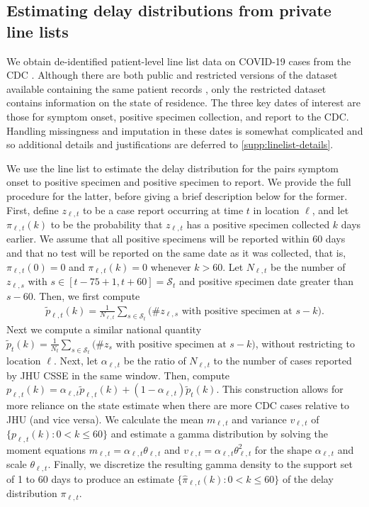 \subsection{Estimating delay distributions from private line lists}
\label{sec:delaystop}

We obtain de-identified patient-level line list data on COVID-19 cases from the
CDC \citep{cdc2020caserestr}. 
Although there are both public and restricted versions of the dataset
available containing the same patient records \citep{cdc2020casepub,
cdc2020caserestr}, only the restricted dataset contains information on the state
of residence. The three key dates of interest are those for symptom onset,
positive specimen collection, and report to the CDC. Handling missingness and
imputation in these dates is somewhat complicated and so additional details and
justifications are deferred to \autoref{supp:linelist-details}.

We use the line list to estimate the delay distribution for the pairs symptom
onset to positive specimen and positive specimen to report. We provide the full
procedure for the latter, before giving a brief description below for the
former. First, define $z_{\ell,t}$ to be a case report occurring at time $t$ in
location $\ell$, and let $\pi_{\ell,t}(k)$ to be the probability that
$z_{\ell,t}$ has a positive specimen collected $k$ days earlier. We assume that
all positive specimens will be reported within 60 days and that no test will be
reported on the same date as it was collected, that is, $\pi_{\ell,t}(0) = 0$
and $\pi_{\ell,t}(k) = 0$ whenever $k > 60$. Let $N_{\ell,t}$ be the number of
$z_{\ell,s}$ with $s\in[t-75+1,t+60] = \mathcal{S}_t$ and positive specimen date
greater than $s-60$. Then, we first compute
\begin{align}
    \tilde{p}_{\ell,t}(k) = \frac{1}{N_{\ell,t}}\sum_{s \in \mathcal{S}_t}
    \big(\textrm{\# $z_{\ell,s}$ with positive specimen at $s-k$}\big).
\end{align}
Next we compute a similar national quantity $\tilde{p}_{t}(k) =
\frac{1}{N_{t}}\sum_{s \in \mathcal{S}_t} \big(\textrm{\# $z_{s}$ with positive
specimen at $s-k$}\big)$, without restricting to location $\ell$. Next, let
$\alpha_{\ell,t}$ be the ratio of $N_{\ell,t}$ to the number of cases reported
by JHU CSSE\cite{dong2020interactive} in the same window. Then, compute
$p_{\ell,t}(k) = \alpha_{\ell,t}\tilde{p}_{\ell,t}(k) +
(1-\alpha_{\ell,t})\tilde{p}_t(k)$. This construction allows for more reliance
on the state estimate when there are more CDC cases relative to JHU (and vice
versa). We calculate the mean $m_{\ell,t}$ and variance $v_{\ell,t}$ of
$\{p_{\ell,t}(k) : 0<k\leq 60\}$ and estimate a gamma distribution by solving
the moment equations $m_{\ell,t} = \alpha_{\ell,t}\theta_{\ell,t}$ and
$v_{\ell,t}= \alpha_{\ell,t}\theta_{\ell,t}^2$ for the shape $\alpha_{\ell,t}$
and scale $\theta_{\ell,t}$. Finally, we discretize the resulting gamma density
to the support set of 1 to 60 days to produce an estimate
$\{\widehat{\pi}_{\ell,t}(k): 0 < k \leq 60\}$ of the delay distribution
$\pi_{\ell,t}$.
 

